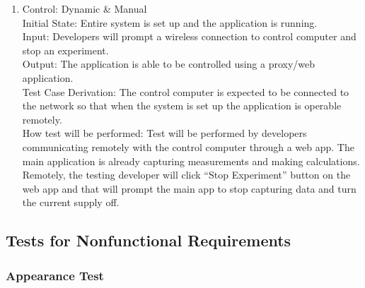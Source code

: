\documentclass[12pt, titlepage]{article}
\begin{document}
\begin{enumerate}[{FR-T}1.]
    \item Control: Dynamic \& Manual\\
    Initial State: Entire system is set up and the application is running.\\
    Input: Developers will prompt a wireless connection to control computer and stop an experiment.\\
    Output: The application is able to be controlled using a proxy/web application.\\
    Test Case Derivation: The control computer is expected to be connected to the network so that when the system is set up the application is operable remotely.\\
    How test will be performed: Test will be performed by developers communicating remotely with the control computer through a web app. The main application is already capturing measurements and making calculations. Remotely, the testing developer will click “Stop Experiment” button on the web app and that will prompt the main app to stop capturing data and turn the current supply off.

\end{enumerate}

\subsection{Tests for Nonfunctional Requirements}

\subsubsection{Appearance Test}
\end{document}
